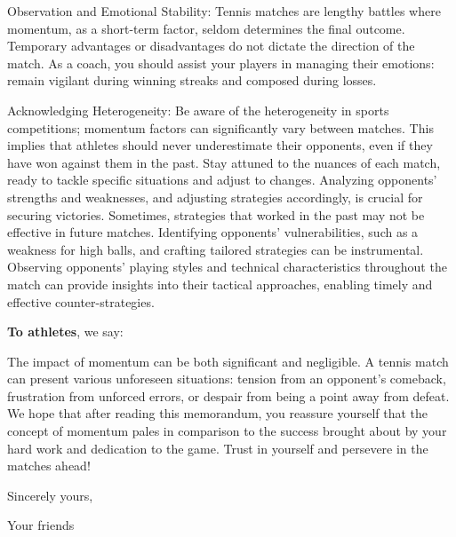 \documentclass{mcmthesis}
\begin{document}
Observation and Emotional Stability: Tennis matches are lengthy battles where momentum, as a short-term factor, seldom determines the final outcome. Temporary advantages or disadvantages do not dictate the direction of the match. As a coach, you should assist your players in managing their emotions: remain vigilant during winning streaks and composed during losses.

Acknowledging Heterogeneity: Be aware of the heterogeneity in sports competitions; momentum factors can significantly vary between matches. This implies that athletes should never underestimate their opponents, even if they have won against them in the past. Stay attuned to the nuances of each match, ready to tackle specific situations and adjust to changes. Analyzing opponents' strengths and weaknesses, and adjusting strategies accordingly, is crucial for securing victories. Sometimes, strategies that worked in the past may not be effective in future matches. Identifying opponents' vulnerabilities, such as a weakness for high balls, and crafting tailored strategies can be instrumental. Observing opponents' playing styles and technical characteristics throughout the match can provide insights into their tactical approaches, enabling timely and effective counter-strategies.

\textbf{To athletes}, we say:

The impact of momentum can be both significant and negligible. A tennis match can present various unforeseen situations: tension from an opponent's comeback, frustration from unforced errors, or despair from being a point away from defeat. We hope that after reading this memorandum, you reassure yourself that the concept of momentum pales in comparison to the success brought about by your hard work and dedication to the game. Trust in yourself and persevere in the matches ahead!

\vspace{\parskip}

Sincerely yours,

Your friends
\end{document}

